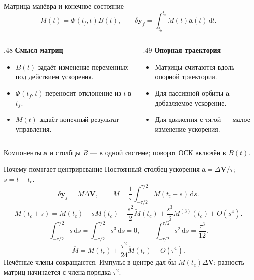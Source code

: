 \documentclass[11pt,aspectratio=169,t]{beamer}
\newcommand{\eqcompact}{\fontsize{10}{12}\selectfont}
\newcommand{\derivationmathspacing}{%
  \setlength{\abovedisplayskip}{2pt}%
  \setlength{\belowdisplayskip}{3pt}%
  \setlength{\abovedisplayshortskip}{2pt}%
  \setlength{\belowdisplayshortskip}{2pt}%
  \setlength{\jot}{2pt}}
\newcommand{\vect}[1]{\boldsymbol{#1}}
\begin{document}
\begin{frame}{Матрица манёвра и конечное состояние}
\relax\derivationmathspacing
{\eqcompact\derivationmathspacing
\[
 M(t)=\Phi(t_f,t)B(t),\qquad
 \boxed{\delta\vect y_f=\int_{t_b}^{t_e}M(t)\vect a(t)\,\mathrm dt.}
\]
}
\begin{columns}[T,onlytextwidth]
\begin{column}{.48\textwidth}
\textbf{Смысл матриц}
\begin{itemize}
\setlength{\itemsep}{2pt}
\item $B(t)$ задаёт изменение переменных под действием ускорения.
\item $\Phi(t_f,t)$ переносит отклонение из $t$ в $t_f$.
\item $M(t)$ задаёт конечный результат управления.
\end{itemize}
\end{column}
\begin{column}{.49\textwidth}
\textbf{Опорная траектория}
\begin{itemize}
\setlength{\itemsep}{2pt}
\item Матрицы считаются вдоль опорной траектории.
\item Для пассивной орбиты $\vect a$ --- добавляемое ускорение.
\item Для движения с тягой --- малое изменение ускорения.
\end{itemize}
\end{column}
\end{columns}
\smallskip
Компоненты $\vect a$ и столбцы $B$ --- в одной системе; поворот ОСК включён в $B(t)$.
\end{frame}

\begin{frame}{Почему помогает центрирование}
\relax\derivationmathspacing
Постоянный столбец ускорения $\vect a=\Delta\vect V/\tau$; $s=t-t_c$.
{\eqcompact\derivationmathspacing
\[
 \delta\vect y_f=\overline M\Delta\vect V,\qquad
 \overline M=\frac1\tau\int_{-\tau/2}^{\tau/2}M(t_c+s)\,\mathrm ds.
\]
\[
 M(t_c+s)=M(t_c)+s\dot M(t_c)+\frac{s^2}{2}\ddot M(t_c)
                 +\frac{s^3}{6}M^{(3)}(t_c)+O(s^4).
\]
}
{\eqcompact\derivationmathspacing
\[
 \int_{-\tau/2}^{\tau/2}s\,\mathrm ds=
 \int_{-\tau/2}^{\tau/2}s^3\,\mathrm ds=0,\qquad
 \int_{-\tau/2}^{\tau/2}s^2\,\mathrm ds=\frac{\tau^3}{12}.
\]
}
{\eqcompact\derivationmathspacing
\[
 \boxed{\overline M=M(t_c)+\frac{\tau^2}{24}\ddot M(t_c)+O(\tau^4).}
\]
}
Нечётные члены сокращаются. Импульс в центре дал бы $M(t_c)\Delta\vect V$; разность матриц начинается с члена порядка $\tau^2$.
\end{frame}
\end{document}
